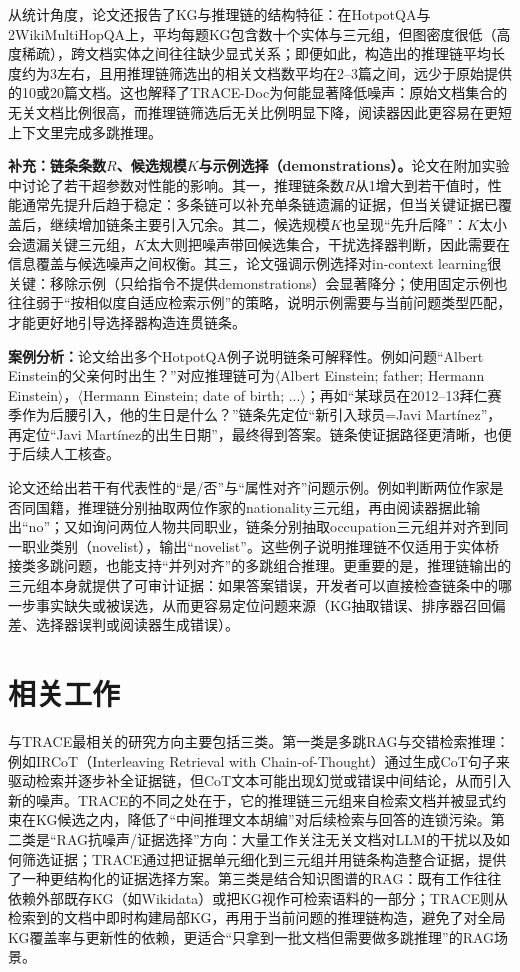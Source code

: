 从统计角度，论文还报告了KG与推理链的结构特征：在HotpotQA与2Wiki\-MultiHopQA上，平均每题KG包含数十个实体与三元组，但图密度很低（高度稀疏），跨文档实体之间往往缺少显式关系；即便如此，构造出的推理链平均长度约为3左右，且用推理链筛选出的相关文档数平均在2--3篇之间，远少于原始提供的10或20篇文档。这也解释了TRACE-Doc为何能显著降低噪声：原始文档集合的无关文档比例很高，而推理链筛选后无关比例明显下降，阅读器因此更容易在更短上下文里完成多跳推理。

\textbf{补充：链条条数$R$、候选规模$K$与示例选择（demonstrations）。}论文在附加实验中讨论了若干超参数对性能的影响。其一，推理链条数$R$从1增大到若干值时，性能通常先提升后趋于稳定：多条链可以补充单条链遗漏的证据，但当关键证据已覆盖后，继续增加链条主要引入冗余。其二，候选规模$K$也呈现“先升后降”：$K$太小会遗漏关键三元组，$K$太大则把噪声带回候选集合，干扰选择器判断，因此需要在信息覆盖与候选噪声之间权衡。其三，论文强调示例选择对in-context learning很关键：移除示例（只给指令不提供demonstrations）会显著降分；使用固定示例也往往弱于“按相似度自适应检索示例”的策略，说明示例需要与当前问题类型匹配，才能更好地引导选择器构造连贯链条。

\textbf{案例分析：}论文给出多个HotpotQA例子说明链条可解释性。例如问题“Albert Einstein的父亲何时出生？”对应推理链可为$\langle$Albert Einstein; father; Hermann Einstein$\rangle$，$\langle$Hermann Einstein; date of birth; ...$\rangle$；再如“某球员在2012--13拜仁赛季作为后腰引入，他的生日是什么？”链条先定位“新引入球员=Javi Martínez”，再定位“Javi Martínez的出生日期”，最终得到答案。链条使证据路径更清晰，也便于后续人工核查。

论文还给出若干有代表性的“是/否”与“属性对齐”问题示例。例如判断两位作家是否同国籍，推理链分别抽取两位作家的nationality三元组，再由阅读器据此输出“no”；又如询问两位人物共同职业，链条分别抽取occupation三元组并对齐到同一职业类别（novelist），输出“novelist”。这些例子说明推理链不仅适用于实体桥接类多跳问题，也能支持“并列对齐”的多跳组合推理。更重要的是，推理链输出的三元组本身就提供了可审计证据：如果答案错误，开发者可以直接检查链条中的哪一步事实缺失或被误选，从而更容易定位问题来源（KG抽取错误、排序器召回偏差、选择器误判或阅读器生成错误）。

\section{相关工作}
与TRACE最相关的研究方向主要包括三类。第一类是多跳RAG与交错检索推理：例如IRCoT（Interleaving Retrieval with Chain-of-Thought）通过生成CoT句子来驱动检索并逐步补全证据链，但CoT文本可能出现幻觉或错误中间结论，从而引入新的噪声。TRACE的不同之处在于，它的推理链三元组来自检索文档并被显式约束在KG候选之内，降低了“中间推理文本胡编”对后续检索与回答的连锁污染。第二类是“RAG抗噪声/证据选择”方向：大量工作关注无关文档对LLM的干扰以及如何筛选证据；TRACE通过把证据单元细化到三元组并用链条构造整合证据，提供了一种更结构化的证据选择方案。第三类是结合知识图谱的RAG：既有工作往往依赖外部既存KG（如Wikidata）或把KG视作可检索语料的一部分；TRACE则从检索到的文档中即时构建局部KG，再用于当前问题的推理链构造，避免了对全局KG覆盖率与更新性的依赖，更适合“只拿到一批文档但需要做多跳推理”的RAG场景。

